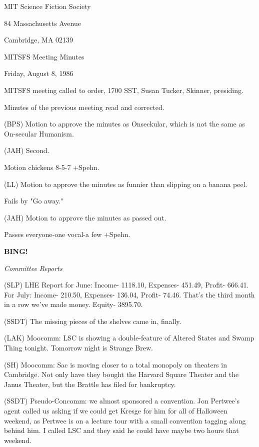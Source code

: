 \documentclass[12pt]{article}
\newcommand{\bing}{{\bf BING!} }
\newcommand{\goto}[1]{\bing \vskip 12pt \centerline{{\em{#1}}}}
\begin{document}
\begin{center}

MIT Science Fiction Society 

84 Massachusetts Avenue

Cambridge, MA 02139

\vspace{12pt}

MITSFS Meeting Minutes 

Friday, August 8, 1986

\end{center}
 
\vspace{18pt}

\setlength{\parskip}{6pt}

\noindent
MITSFS meeting called to order, 1700 SST,
Susan Tucker, Skinner, presiding.

Minutes of the previous meeting read and corrected.

(BPS) Motion to approve the minutes as Onseckular, which is not the same as On-secular Humanism.

(JAH) Second.

Motion chickens 8-5-7 +Spehn.

(LL) Motion to approve the minutes as funnier than slipping on a banana peel.

Fails by "Go away."

(JAH) Motion to approve the minutes as passed out.

Passes everyone-one vocal-a few +Spehn.

\goto{Committee Reports}

(SLP) LHE Report for June: Income- 1118.10, Expenses- 451.49, Profit- 666.41. For July: Income- 210.50, Expenses- 136.04, Profit- 74.46. That's the third month in a row we've made money. Equity- 3895.70.

(SSDT) The missing pieces of the shelves came in, finally.

(LAK) Moocomm: LSC is showing a double-feature of Altered States and Swamp Thing tonight. Tomorrow night is Strange Brew.

(SH) Moocomm: Sac is moving closer to a total monopoly on theaters in Cambridge. Not only have they bought the Harvard Square Theater and the Janus Theater, but the Brattle has filed for bankruptcy.

(SSDT) Pseudo-Concomm: we almost sponsored a convention. Jon Pertwee's agent called us asking if we could get Kresge for him for all of Halloween weekend, as Pertwee is on a lecture tour with a small convention tagging along behind him. I called LSC and they said he could have maybe two hours that weekend.
\end{document}
